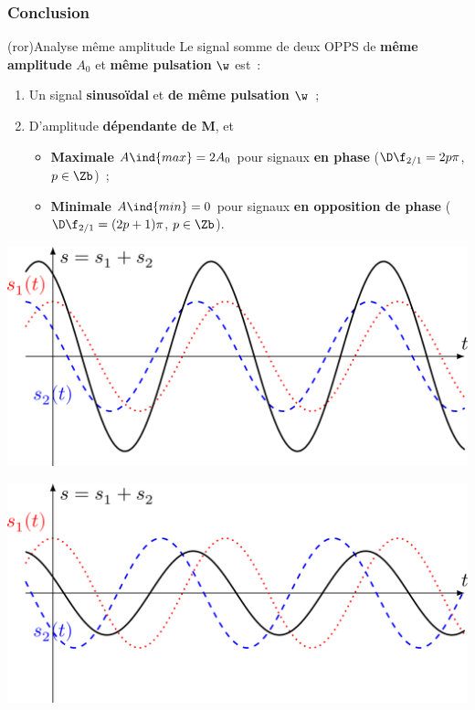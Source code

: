 \documentclass[../../main/main.tex]{subfiles}
\begin{document}
\subsubsection{Conclusion}
\begin{tcb}[breakable](ror){Analyse même amplitude}
	Le signal somme de deux OPPS de \textbf{même amplitude} $A_0$ et \textbf{même
		pulsation} $\w$ est~:
	\begin{enumerate}
		\item Un signal \textbf{sinusoïdal} et \textbf{de même pulsation
			      $\mathbf{\w}$}~;
		\item D'amplitude \textbf{dépendante de M}, et
		      \begin{itemize}
			      \item \textbf{Maximale} $A\ind{max} = 2A_0$ pour signaux \textbf{en
				            phase} ($\D\f_{2/1} = 2p\pi$, $p\in\Zb$)~;
			      \item \textbf{Minimale} $A\ind{min} = 0$ pour signaux \textbf{en
			            opposition de phase} ($\D\f_{2/1} = (2p+1)\pi$, $p\in\Zb$).
		      \end{itemize}
	\end{enumerate}
	\begin{isd}
		\begin{center}
			\includegraphics[width=\linewidth]{somme_pi3}
			\captionsetup{justification=centering}
			\label{fig:sommepi3}
		\end{center}
		\tcblower
		\begin{center}
			\includegraphics[width=\linewidth]{somme_3pi4}
			\captionsetup{justification=centering}
			\label{fig:somme3pi4}
		\end{center}
	\end{isd}
\end{tcb}
\end{document}
